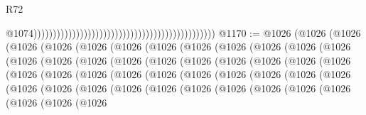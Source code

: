 \begin{lexlean}{R72}
\begin{coremodule}
                                                                                                  @1074)))))))))))))))))))))))))))))))))))))))))))))))
@1170 := @1026
    (@1026
      (@1026
        (@1026
          (@1026
            (@1026
              (@1026
                (@1026
                  (@1026
                    (@1026
                      (@1026
                        (@1026
                          (@1026
                            (@1026
                              (@1026
                                (@1026
                                  (@1026
                                    (@1026
                                      (@1026
                                        (@1026
                                          (@1026
                                            (@1026
                                              (@1026
                                                (@1026
                                                  (@1026
                                                    (@1026
                                                      (@1026
                                                        (@1026
                                                          (@1026
                                                            (@1026
                                                              (@1026
                                                                (@1026
                                                                  (@1026
                                                                    (@1026
                                                                      (@1026
                                                                        (@1026
                                                                          (@1026
                                                                            (@1026
                                                                              (@1026
                                                                                (@1026
                                                                                  (@1026
                                                                                    (@1026
                                                                                      (@1026
                                                                                        (@1026
                                                                                          (@1026
                                                                                            (@1026

\end{coremodule}
\end{lexlean}
